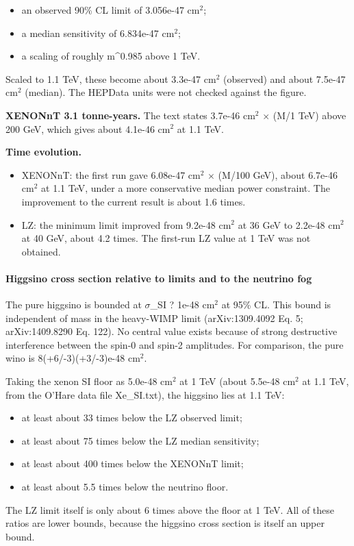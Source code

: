 \documentclass[11pt,a4paper]{article}
\begin{document}
\begin{itemize}
  \item an observed 90\% CL limit of 3.056e-47 cm$^2$;
  \item a median sensitivity of 6.834e-47 cm$^2$;
  \item a scaling of roughly m\textasciicircum{}0.985 above 1 TeV.
\end{itemize}
Scaled to 1.1 TeV, these become about 3.3e-47 cm$^2$ (observed) and about 7.5e-47 cm$^2$ (median). The HEPData units were not checked against the figure.

\textbf{XENONnT 3.1 tonne-years.} The text states 3.7e-46 cm$^2$ $\times$ (M/1 TeV) above 200 GeV, which gives about 4.1e-46 cm$^2$ at 1.1 TeV.

\textbf{Time evolution.}

\begin{itemize}
  \item XENONnT: the first run gave 6.08e-47 cm$^2$ $\times$ (M/100 GeV), about 6.7e-46 cm$^2$ at 1.1 TeV, under a more conservative median power constraint. The improvement to the current result is about 1.6 times.
  \item LZ: the minimum limit improved from 9.2e-48 cm$^2$ at 36 GeV to 2.2e-48 cm$^2$ at 40 GeV, about 4.2 times. The first-run LZ value at 1 TeV was not obtained.
\end{itemize}
\paragraph{Higgsino cross section relative to limits and to the neutrino fog}
The pure higgsino is bounded at $\sigma$\_SI ? 1e-48 cm$^2$ at 95\% CL. This bound is independent of mass in the heavy-WIMP limit (arXiv:1309.4092 Eq. 5; arXiv:1409.8290 Eq. 122). No central value exists because of strong destructive interference between the spin-0 and spin-2 amplitudes. For comparison, the pure wino is 8(+6/-3)(+3/-3)e-48 cm$^2$.

Taking the xenon SI floor as 5.0e-48 cm$^2$ at 1 TeV (about 5.5e-48 cm$^2$ at 1.1 TeV, from the O'Hare data file Xe\_SI.txt), the higgsino lies at 1.1 TeV:

\begin{itemize}
  \item at least about 33 times below the LZ observed limit;
  \item at least about 75 times below the LZ median sensitivity;
  \item at least about 400 times below the XENONnT limit;
  \item at least about 5.5 times below the neutrino floor.
\end{itemize}
The LZ limit itself is only about 6 times above the floor at 1 TeV. All of these ratios are lower bounds, because the higgsino cross section is itself an upper bound.
\end{document}
